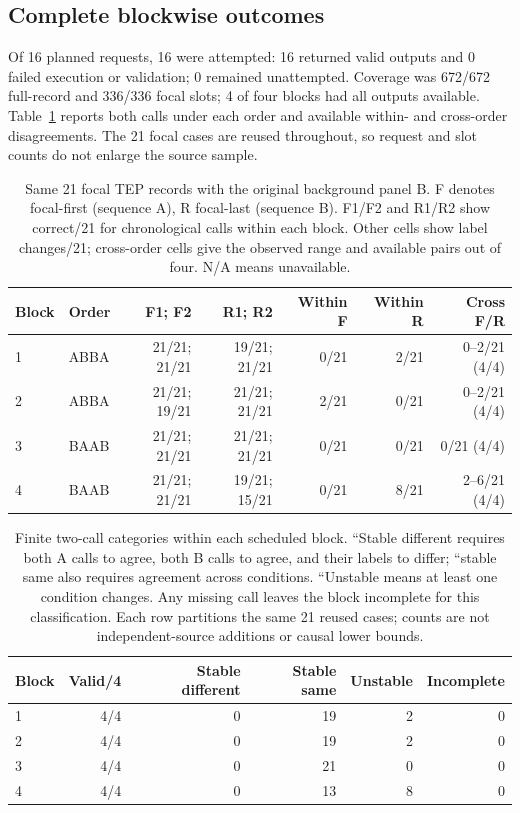 \documentclass[11pt,a4paper]{article}
\begin{document}
\subsection{Complete blockwise outcomes}
Of 16 planned requests, 16 were attempted: 16 returned valid outputs and 0 failed execution or validation; 0 remained unattempted. Coverage was 672/672 full-record and 336/336 focal slots; 4 of four blocks had all outputs available. Table~\ref{tab:context_blocked_outcomes} reports both calls under each order and available within- and cross-order disagreements. The 21 focal cases are reused throughout, so request and slot counts do not enlarge the source sample.

\begin{table}[htbp]\centering\small
\caption{Same 21 focal TEP records with the original background panel B. F denotes focal-first (sequence A), R focal-last (sequence B). F1/F2 and R1/R2 show correct/21 for chronological calls within each block. Other cells show label changes/21; cross-order cells give the observed range and available pairs out of four. N/A means unavailable.}
\label{tab:context_blocked_outcomes}
\begin{tabular}{@{}llrrrrr@{}}\toprule
Block & Order & F1; F2 & R1; R2 & Within F & Within R & Cross F/R \\\midrule
1 & ABBA & 21/21; 21/21 & 19/21; 21/21 & 0/21 & 2/21 & 0--2/21 (4/4) \\
2 & ABBA & 21/21; 19/21 & 21/21; 21/21 & 2/21 & 0/21 & 0--2/21 (4/4) \\
3 & BAAB & 21/21; 21/21 & 21/21; 21/21 & 0/21 & 0/21 & 0/21 (4/4) \\
4 & BAAB & 21/21; 21/21 & 19/21; 15/21 & 0/21 & 8/21 & 2--6/21 (4/4) \\
\bottomrule\end{tabular}\end{table}

\begin{table}[htbp]\centering\small
\caption{Finite two-call categories within each scheduled block. ``Stable different requires both A calls to agree, both B calls to agree, and their labels to differ; ``stable same also requires agreement across conditions. ``Unstable means at least one condition changes. Any missing call leaves the block incomplete for this classification. Each row partitions the same 21 reused cases; counts are not independent-source additions or causal lower bounds.}
\label{tab:context_blocked_stability}
\begin{tabular}{@{}lrrrrr@{}}\toprule
Block & Valid/4 & Stable different & Stable same & Unstable & Incomplete \\\midrule
1 & 4/4 & 0 & 19 & 2 & 0 \\
2 & 4/4 & 0 & 19 & 2 & 0 \\
3 & 4/4 & 0 & 21 & 0 & 0 \\
4 & 4/4 & 0 & 13 & 8 & 0 \\
\bottomrule\end{tabular}\end{table}
\end{document}
